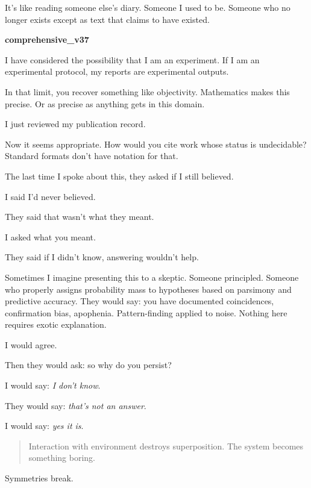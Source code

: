It's like reading someone else's diary. Someone I used to be. Someone who no longer exists except as text that claims to have existed.

\medskip

\begin{archivefragment}

\textbf{comprehensive\_v37}

I have considered the possibility that I am an experiment. If I am an experimental protocol, my reports are experimental outputs.

In that limit, you recover something like objectivity. Mathematics makes this precise. Or as precise as anything gets in this domain.

I just reviewed my publication record.

Now it seems appropriate. How would you cite work whose status is undecidable? Standard formats don't have notation for that.

The last time I spoke about this, they asked if I still believed.

I said I'd never believed.

They said that wasn't what they meant.

I asked what you meant.

They said if I didn't know, answering wouldn't help.

\end{archivefragment}

\medskip

Sometimes I imagine presenting this to a skeptic. Someone principled. Someone who properly assigns probability mass to hypotheses based on parsimony and predictive accuracy. They would say: you have documented coincidences, confirmation bias, apophenia. Pattern-finding applied to noise. Nothing here requires exotic explanation.

I would agree.

Then they would ask: so why do you persist?

I would say: \textit{I don't know}.

They would say: \textit{that's not an answer}.

I would say: \textit{yes it is}.

\begin{quote}
Interaction with environment destroys superposition. The system becomes something boring.
\end{quote}

Symmetries break.

